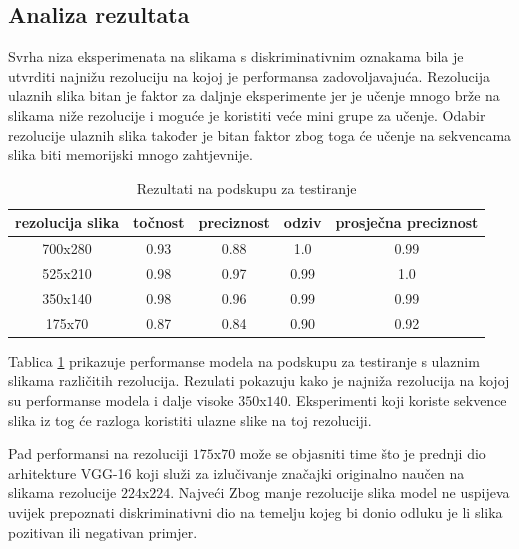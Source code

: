 \documentclass[times, utf8, diplomski, numeric]{fer}
\begin{document}
\subsection{Analiza rezultata}
Svrha niza eksperimenata na slikama s diskriminativnim oznakama bila je utvrditi najnižu rezoluciju na kojoj je performansa zadovoljavajuća.
Rezolucija ulaznih slika bitan je faktor za daljnje eksperimente jer je učenje mnogo brže na slikama niže rezolucije i moguće je koristiti veće mini grupe za učenje.
Odabir rezolucije ulaznih slika također je bitan faktor zbog toga će učenje na sekvencama slika biti memorijski mnogo zahtjevnije.
\begin{table}[H]
\centering
\caption{Rezultati na podskupu za testiranje}
\label{score:single_hand_test_resolutions}
\begin{tabular}{|c|c|c|c|c|}
\hline
rezolucija slika & točnost & preciznost & odziv & prosječna preciznost \\ \hline
700x280          &     0.93    &   0.88         &   1.0    &       0.99               \\ \hline
525x210          &    0.98     &    0.97        &   0.99    &       1.0               \\ \hline
350x140          &     0.98    &    0.96        &   0.99    &        0.99              \\ \hline
175x70           &    0.87     &    0.84        &   0.90    &      0.92                \\ \hline
\end{tabular}
\end{table}
Tablica \ref{score:single_hand_test_resolutions} prikazuje performanse modela na podskupu za testiranje s ulaznim slikama različitih rezolucija.
Rezulati pokazuju kako je najniža rezolucija na kojoj su performanse modela i dalje visoke $350$x$140$. 
Eksperimenti koji koriste sekvence slika iz tog će razloga koristiti ulazne slike na toj rezoluciji.

Pad performansi na rezoluciji $175$x$70$ može se objasniti time što je prednji dio arhitekture VGG-16 koji
služi za izlučivanje značajki originalno naučen na slikama rezolucije $224$x$224$. 
Najveći
Zbog manje rezolucije slika model ne uspijeva uvijek prepoznati diskriminativni dio na temelju kojeg bi donio odluku je li slika pozitivan ili negativan primjer.
\end{document}
